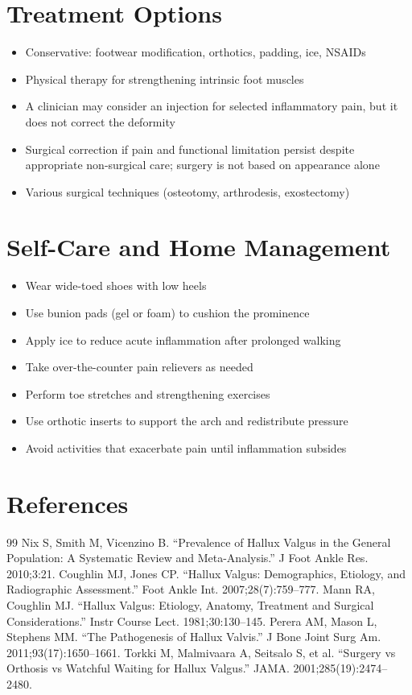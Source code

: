 \section*{Treatment Options}
\begin{itemize}
\item Conservative: footwear modification, orthotics, padding, ice, NSAIDs
\item Physical therapy for strengthening intrinsic foot muscles
 \item A clinician may consider an injection for selected inflammatory pain, but it does not correct the deformity
 \item Surgical correction if pain and functional limitation persist despite appropriate non-surgical care; surgery is not based on appearance alone
\item Various surgical techniques (osteotomy, arthrodesis, exostectomy)
\end{itemize}
\section*{Self-Care and Home Management}
\begin{itemize}
\item Wear wide-toed shoes with low heels
\item Use bunion pads (gel or foam) to cushion the prominence
\item Apply ice to reduce acute inflammation after prolonged walking
\item Take over-the-counter pain relievers as needed
\item Perform toe stretches and strengthening exercises
\item Use orthotic inserts to support the arch and redistribute pressure
\item Avoid activities that exacerbate pain until inflammation subsides
\end{itemize}

\section*{References}
\begin{thebibliography}{99}
 Nix S, Smith M, Vicenzino B. ``Prevalence of Hallux Valgus in the General Population: A Systematic Review and Meta-Analysis.'' J Foot Ankle Res. 2010;3:21.
 Coughlin MJ, Jones CP. ``Hallux Valgus: Demographics, Etiology, and Radiographic Assessment.'' Foot Ankle Int. 2007;28(7):759--777.
 Mann RA, Coughlin MJ. ``Hallux Valgus: Etiology, Anatomy, Treatment and Surgical Considerations.'' Instr Course Lect. 1981;30:130--145.
 Perera AM, Mason L, Stephens MM. ``The Pathogenesis of Hallux Valvis.'' J Bone Joint Surg Am. 2011;93(17):1650--1661.
 Torkki M, Malmivaara A, Seitsalo S, et al. ``Surgery vs Orthosis vs Watchful Waiting for Hallux Valgus.'' JAMA. 2001;285(19):2474--2480.
\end{thebibliography}
